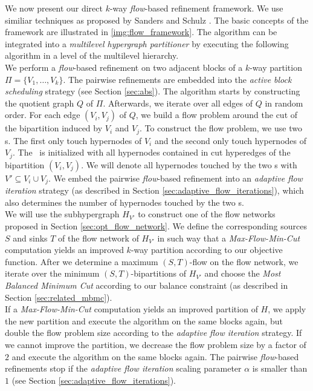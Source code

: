 We now present our direct $k$-way \emph{flow}-based refinement framework. 
We use similiar techniques as proposed
by Sanders and Schulz \cite{sanders2011engineering}. 
The basic concepts of the framework are illustrated in \autoref{img:flow_framework}.
The algorithm can be integrated into a \emph{multilevel hypergraph partitioner} 
by executing the following algorithm in a level of the multilevel hierarchy.  \\
We perform a \emph{flow}-based refinement on two adjacent blocks of
a $k$-way partition $\Pi = \{V_1,\ldots,V_k\}$. The pairwise refinements are embedded 
into the \emph{active block scheduling} strategy (see Section \ref{sec:abs}).
The algorithm starts by constructing the quotient graph $Q$ of $\Pi$. 
Afterwards, we iterate over all edges of $Q$ in random order. For each edge
$(V_i,V_j)$ of $Q$, we build a flow problem around the cut of the bipartition
induced by $V_i$ and $V_j$. To construct the flow problem, we use two \BFS s. The first only 
touch hypernodes of $V_i$ and the second only touch hypernodes of $V_j$.
The \BFS~is initialized with all hypernodes contained in cut hyperedges
of the bipartition $(V_i,V_j)$. We will denote all hypernodes touched by 
the two \BFS s with $V' \subseteq V_i \cup V_j$.
We embed the pairwise \emph{flow}-based refinement
into an \emph{adaptive flow iteration} strategy
(as described in Section \ref{sec:adaptive_flow_iterations}), which also determines
the number of hypernodes touched by the two \BFS s. \\
We will use the subhypergraph $H_{V'}$ to construct one of the flow networks 
proposed in Section \ref{sec:opt_flow_network}. 
We define the corresponding sources $S$
and sinks $T$ of the flow network of $H_{V'}$ in such way that a \emph{Max-Flow-Min-Cut} 
computation yields an improved $k$-way partition according to our objective function.
After we determine a maximum $(S,T)$-flow on the flow network, we iterate over
the minimum $(S,T)$-bipartitions of $H_{V'}$  and choose 
the \emph{Most Balanced Minimum Cut} according to our balance constraint
(as described in Section \ref{sec:related_mbmc}). \\
If a \emph{Max-Flow-Min-Cut} computation yields an improved partition of $H$, we apply
the new partition and execute the algorithm on the same blocks again, but double
the flow problem size according to the \emph{adaptive flow iteration} strategy. If
we cannot improve the partition, we decrease the flow problem size by a factor of $2$
and execute the algorithm on the same blocks again. The pairwise \emph{flow}-based
refinements stop if the \emph{adaptive flow iteration} scaling parameter $\alpha$ is
smaller than $1$ (see Section \ref{sec:adaptive_flow_iterations}).

